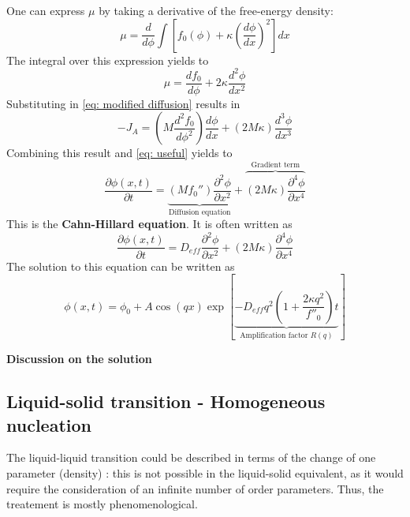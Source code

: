 \documentclass[../phys-f308.tex]{subfiles}
\begin{document}
    One can express $\mu$ by taking a derivative of the free-energy density:
    \begin{equation}
        \mu = \frac{d}{d\phi}\int \left[f_0(\phi)+\kappa\left(\frac{d\phi}{dx}\right)^2\right]dx
    \end{equation}
    The integral over this expression yields to 
    \begin{equation}
        \mu = \frac{df_0}{d\phi} + 2\kappa\frac{d^2\phi}{dx^2}
    \end{equation}
    Substituting in \eqref{eq: modified diffusion} results in
    \begin{equation}
        -J_A = \left(M\frac{d^2f_0}{d\phi^2}\right)\frac{d\phi}{dx} + \left(2M\kappa\right)\frac{d^3\phi}{dx^3}
    \end{equation}
    Combining this result and \eqref{eq: useful} yields to
    \begin{equation}
        \frac{\partial\phi(x,t)}{\partial t} = \underbrace{\left(Mf_0''\right)\frac{\partial^2\phi}{\partial x^2}}_{\text{Diffusion equation}}+\overbrace{\left(2M\kappa\right)\frac{\partial^4\phi}{\partial x^4}}^{\text{Gradient term}}
    \end{equation}
    This is the \color{purple}\textbf{Cahn-Hillard equation}\color{black}. It is often written as
    \begin{equation}
        \frac{\partial\phi(x,t)}{\partial t} = D_{eff}\frac{\partial^2\phi}{\partial x^2}+\left(2M\kappa\right)\frac{\partial^4\phi}{\partial x^4}
    \end{equation}
    The solution to this equation can be written as 
    \begin{equation}
        \phi(x,t) = \phi_0 + A\cos\left(qx\right)\exp\left[\underbrace{-D_{eff}q^2\left(1+\frac{2\kappa q^2}{f''_0}\right)t}_{\text{Amplification factor } R(q)}\right]
    \end{equation}

    \color{red}\textbf{Discussion on the solution }\color{black}

    \subsection{Liquid-solid transition - Homogeneous nucleation}
    The liquid-liquid transition could be described in terms of the change of one parameter (density) : this is not possible in the liquid-solid equivalent, as it would require the consideration of an infinite number of order parameters. Thus, the treatement is mostly phenomenological.\\
\end{document}
